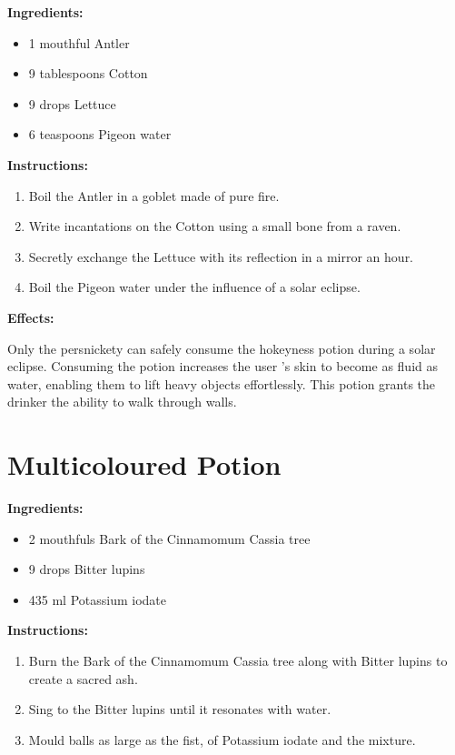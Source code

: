 \documentclass{article}
\begin{document}
\textbf{Ingredients:}

\begin{itemize}
  \item 1 mouthful Antler
  \item 9 tablespoons Cotton
  \item 9 drops Lettuce
  \item 6 teaspoons Pigeon water
\end{itemize}

\textbf{Instructions:}

\begin{enumerate}
  \item Boil the Antler in a goblet made of pure fire.
  \item Write incantations on the Cotton using a small bone from a raven.
  \item Secretly exchange the Lettuce with its reflection in a mirror an hour.
  \item Boil the Pigeon water under the influence of a solar eclipse.
\end{enumerate}

\textbf{Effects:}

Only the persnickety can safely consume the hokeyness potion during a solar eclipse. Consuming the potion increases the user 's skin to become as fluid as water, enabling them to lift heavy objects effortlessly. This potion grants the drinker the ability to walk through walls.

\newpage
\section*{Multicoloured Potion}

\textbf{Ingredients:}

\begin{itemize}
  \item 2 mouthfuls Bark of the Cinnamomum Cassia tree
  \item 9 drops Bitter lupins
  \item 435 ml Potassium iodate
\end{itemize}

\textbf{Instructions:}

\begin{enumerate}
  \item Burn the Bark of the Cinnamomum Cassia tree along with Bitter lupins to create a sacred ash.
  \item Sing to the Bitter lupins until it resonates with water.
  \item Mould balls as large as the fist, of Potassium iodate and the mixture.
\end{enumerate}
\end{document}
